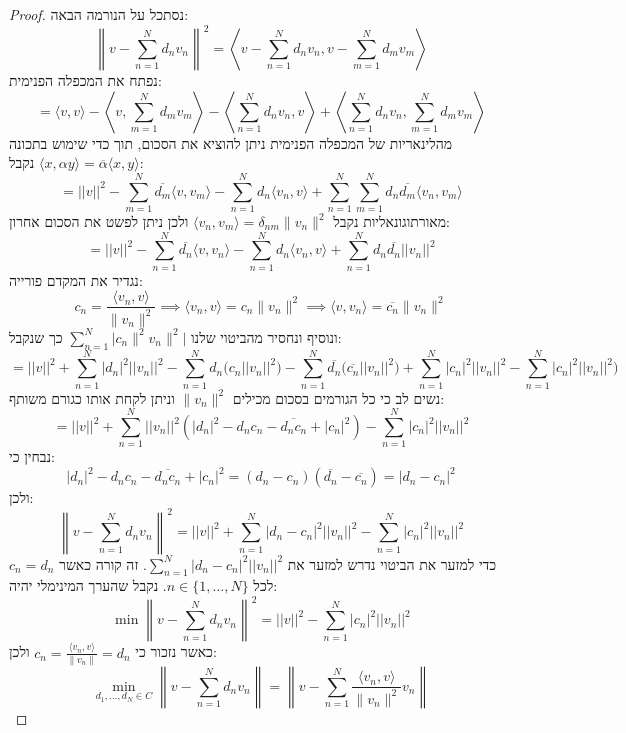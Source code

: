 \documentclass{tstextbook}
\begin{document}
\begin{proof}
נסתכל על הנורמה הבאה:
$$\left\|v-\sum_{n=1}^{N}d_{n}v_{n}\right\|^{2}=\left\langle v-\sum_{n=1}^{N}d_{n}v_{n},v-\sum_{m=1}^{N}d_{m}v_{m}\right\rangle$$
נפתח את המכפלה הפנימית:
$$=\langle v,v\rangle-\left\langle v,\sum_{m=1}^{N}d_{m}v_{m}\right\rangle-\left\langle\sum_{n=1}^{N}d_{n}v_{n},v\right\rangle+\left\langle\sum_{n=1}^{N}d_{n}v_{n},\sum_{m=1}^{N}d_{m}v_{m}\right\rangle$$
מהלינאריות של המכפלה הפנימית ניתן להוציא את הסכום, תוך כדי שימוש בתכונה \(\langle x,\alpha y \rangle=\overline{\alpha}\langle x,y \rangle\) נקבל:
$$=||v||^{2}-\sum_{m=1}^{N}\overline{{{d_{m}}}}\langle v,v_{m}\rangle-\sum_{n=1}^{N}d_{n}\langle v_{n},v\rangle+\sum_{n=1}^{N}\sum_{m=1}^{N}d_{n}\overline{{{d_{m}}}}\langle v_{n},v_{m}\rangle$$
מאורתוגונאליות נקבל \(\langle v_{n},v_{m} \rangle=\delta_{nm}\lVert v_{n} \rVert^{2}\) ולכן ניתן לפשט את הסכום אחרון:
$$=||v||^{2}-\sum_{n=1}^{N}\overline{{{d_{n}}}}\langle v,v_{n}\rangle-\sum_{n=1}^{N}d_{n}\langle v_{n},v\rangle+\sum_{n=1}^{N}d_{n}\overline{{{d_{n}}}}||v_{n}||^{2}$$
נגדיר את המקדם פורייה:
$$c_{n}=\frac{\langle v_{n},v \rangle}{\lVert v_{n} \rVert ^{2}}\implies \langle v_{n},v \rangle =c_{n}\lVert v_{n} \rVert ^{2}\implies \langle v,v_{n} \rangle =\overline{c_{n}} \lVert v_{n} \rVert ^{2}$$
ונוסיף ונחסיר מהביטוי שלנו \(\sum_{n=1}^{N}\lvert c_{n}\lVert^{2} v_{n} \rVert^{2} \rvert\) כך שנקבל:
$$=||v||^{2}+\sum_{n=1}^{N}|d_{n}|^{2}||v_{n}||^{2}-\sum_{n=1}^{N}d_{n}\big(c_{n}||v_{n}||^{2}\big)-\sum_{n=1}^{N}\overline{{{d_{n}}}}\big(\overline{{{c_{n}}}}||v_{n}||^{2}\big)+\sum_{n=1}^{N}|c_{n}|^{2}||v_{n}||^{2}-\sum_{n=1}^{N}|c_{n}|^{2}||v_{n}||^{2}\big)$$
נשים לב כי כל הגורמים בסכום מכילים \(\lVert v_{n} \rVert^{2}\) וניתן לקחת אותו כגורם משותף:
$$=||v||^{2}+\sum_{n=1}^{N}||v_{n}||^{2}\left(|d_{n}|^{2}-d_{n}c_{n}-\overline{{{d_{n}c_{n}}}}+|c_{n}|^{2}\right)-\sum_{n=1}^{N}|c_{n}|^{2}||v_{n}||^{2}$$
נבחין כי:
$$|d_{n}|^{2}-d_{n}c_{n}-{\overline{{d_{n}c_{n}}}}+|c_{n}|^{2}=(d_{n}-c_{n})({\overline{{d_{n}}}}-{\overline{{c_{n}}}})=|d_{n}-c_{n}|^{2}$$
ולכן:
$$\left\|v-\sum_{n=1}^{N}d_{n}v_{n}\right\|^{2}=||v||^{2}+\sum_{n=1}^{N}|d_{n}-c_{n}|^{2}||v_{n}||^{2}-\sum_{n=1}^{N}|c_{n}|^{2}||v_{n}||^{2}$$
כדי למזער את הביטוי נדרש למזער את \(\textstyle\sum_{n=1}^{N}|d_{n}-c_{n}|^{2}||v_{n}||^{2}\). זה קורה כאשר \(c_{n}=d_{n}\) לכל \(n \in \{ 1,\dots ,N \}\). נקבל שהערך המינימלי יהיה:
$$\operatorname*{min}\left\|v-\sum_{n=1}^{N}d_{n}v_{n}\right\|^{2}=||v||^{2}-\sum_{n=1}^{N}|c_{n}|^{2}||v_{n}||^{2}$$
כאשר נזכור כי \(c_{n}=\frac{\langle v_{n},v \rangle}{\lVert v_{n} \rVert}=d_{n}\) ולכן:
$$\operatorname*{min}_{d_{1},\ldots,d_{N}\in C}\left\|v-\sum_{n=1}^{N}d_{n}v_{n}\right\|=\left\|v-\sum_{n=1}^{N}{\frac{\langle v_{n},v\rangle}{\|v_{n}\|^{2}}}v_{n}\right\|$$

\end{proof}
\end{document}
